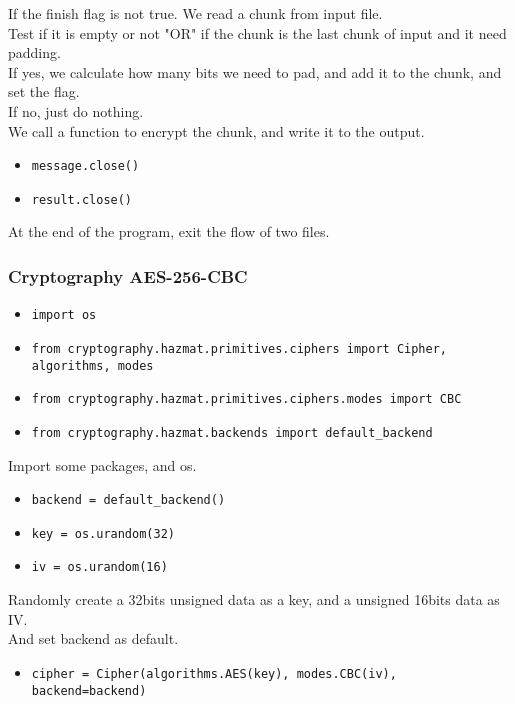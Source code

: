 \documentclass{article}
\begin{document}
\noindent If the finish flag is not true. We read a chunk from input file.\\
Test if it is empty or not "OR" if the chunk is the last chunk of input and it need padding.\\
If yes, we calculate how many bits we need to pad, and add it to the chunk, and set the flag.\\
If no, just do nothing.\\
We call a function to encrypt the chunk, and write it to the output.

\begin{itemize}
\item \verb|message.close()|
\item \verb|result.close()|
\end{itemize}

\noindent At the end of the program, exit the flow of two files.\\

\subsubsection{Cryptography AES-256-CBC}

\begin{itemize}
\item \verb|import os|
\item \verb|from cryptography.hazmat.primitives.ciphers import Cipher, algorithms, modes|
\item \verb|from cryptography.hazmat.primitives.ciphers.modes import CBC|
\item \verb|from cryptography.hazmat.backends import default_backend|
\end{itemize}

\noindent Import some packages, and os.

\begin{itemize}
\item \verb|backend = default_backend()|
\item \verb|key = os.urandom(32)|
\item \verb|iv = os.urandom(16)|
\end{itemize}

\noindent Randomly create a 32bits unsigned data as a key, and a unsigned 16bits data as IV.\\
And set backend as default.

\begin{itemize}
\item \verb|cipher = Cipher(algorithms.AES(key), modes.CBC(iv), backend=backend)|
\end{itemize}
\end{document}
